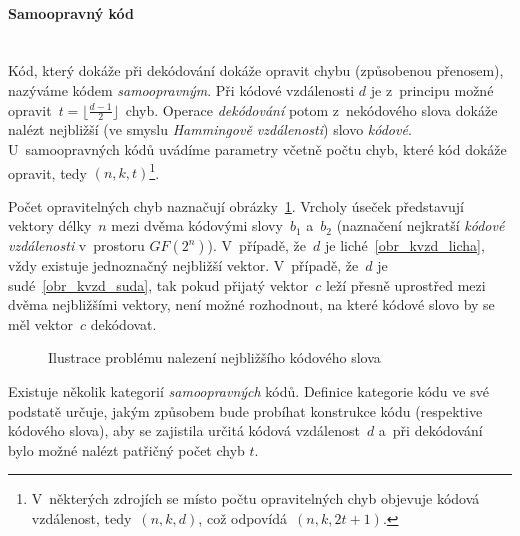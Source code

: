 \documentclass[thesis=M,czech,hidelinks]{FITthesis}[2012/06/26]
\newcommand{\0}{{\textcolor[gray]{0.75}{0}}}
\begin{document}
\paragraph{Samoopravný kód} \hfil \\
Kód, který dokáže při dekódování dokáže opravit chybu (způsobenou přenosem),
nazýváme kódem \emph{samoopravným}. Při kódové vzdálenosti $d$ je z~principu
možné opravit~$t = \lfloor \frac{d-1}{2} \rfloor$~chyb. Operace
\emph{dekódování} potom z~nekódového slova dokáže nalézt nejbližší (ve smyslu
\emph{Hammingově vzdálenosti}) slovo \emph{kódové}. U~samoopravných kódů uvádíme
parametry včetně počtu chyb, které kód dokáže opravit, tedy $(n,k,t)$\footnote{
    V~některých zdrojích se místo počtu opravitelných chyb objevuje kódová
    vzdálenost, tedy~$(n,k,d)$, což odpovídá~$(n,k,2t+1)$.
}.


Počet opravitelných chyb naznačují obrázky~\ref{obr_kvzd}. Vrcholy úseček
představují vektory délky~$n$ mezi dvěma kódovými slovy~$b_1$ a~$b_2$ (naznačení
nejkratší \emph{kódové vzdálenosti} v~prostoru $GF(2^n)$). V~případě, že~$d$ je
liché~\ref{obr_kvzd_licha}, vždy existuje jednoznačný nejbližší vektor. V~případě,
že~$d$ je sudé~\ref{obr_kvzd_suda}, tak pokud přijatý vektor~$c$ leží přesně
uprostřed mezi dvěma nejbližšími vektory, není možné rozhodnout, na které kódové
slovo by se měl vektor~$c$ dekódovat.

\begin{figure}
    \centering
    \quad
    \caption{Ilustrace problému nalezení nejbližšího kódového slova \label{obr_kvzd}}
\end{figure}

Existuje několik kategorií \emph{samoopravných} kódů. Definice kategorie kódu ve
své podstatě určuje, jakým způsobem bude probíhat konstrukce kódu (respektive
kódového slova), aby se zajistila určitá kódová vzdálenost~$d$ a~při dekódování
bylo možné nalézt patřičný počet chyb $t$.
\end{document}
